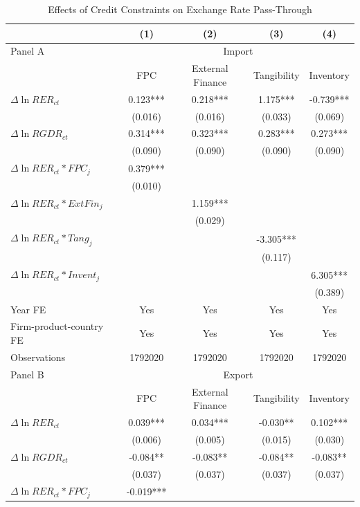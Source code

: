 \documentclass[12pt]{article}
\begin{document}
\begin{table}[htbp]
	\centering
	\caption{Effects of Credit Constraints on Exchange Rate Pass-Through}
	\begin{threeparttable}	
	\begin{tabular}{lcccc}
		\toprule
		& (1)   & (2)   & (3)   & (4) \\
		\midrule
		Panel A & \multicolumn{4}{c}{Import} \\
		& FPC   & External Finance & Tangibility & Inventory \\
		\midrule
		$\Delta \ln RER_{ct}$ & 0.123*** & 0.218*** & 1.175*** & -0.739*** \\
		& (0.016) & (0.016) & (0.033) & (0.069) \\
		$\Delta \ln RGDR_{ct}$ & 0.314*** & 0.323*** & 0.283*** & 0.273*** \\
		& (0.090) & (0.090) & (0.090) & (0.090) \\
		$\Delta \ln RER_{ct}*FPC_{j}$ & 0.379*** &       &       &  \\
		& (0.010) &       &       &  \\
		$\Delta \ln RER_{ct}*ExtFin_{j}$ &       & 1.159*** &       &  \\
		&       & (0.029) &       &  \\
              		$\Delta \ln RER_{ct}*Tang_{j}$ &       &       & -3.305*** &  \\
		&       &       & (0.117) &  \\
		$\Delta \ln RER_{ct}*Invent_{j}$ &       &       &       & 6.305*** \\
		&       &       &       & (0.389) \\
		Year FE  & Yes   & Yes   & Yes   & Yes \\
		Firm-product-country FE & Yes   & Yes   & Yes   & Yes \\
		Observations & 1792020 & 1792020 & 1792020 & 1792020 \\
		\midrule
		Panel B & \multicolumn{4}{c}{Export} \\
		& FPC   & External Finance & Tangibility & Inventory \\
		\midrule
		$\Delta \ln RER_{ct}$ & 0.039*** & 0.034*** & -0.030** & 0.102*** \\
		& (0.006) & (0.005) & (0.015) & (0.030) \\
		$\Delta \ln RGDR_{ct}$ & -0.084** & -0.083** & -0.084** & -0.083** \\
		& (0.037) & (0.037) & (0.037) & (0.037) \\
		$\Delta \ln RER_{ct}*FPC_{j}$ & -0.019*** &       &       &  \\

\end{tabular}
\end{threeparttable}
\end{table}
\end{document}
